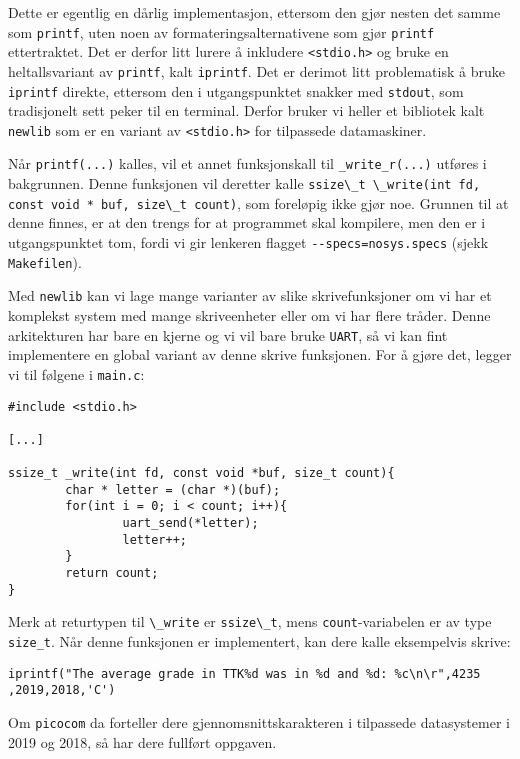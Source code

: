 Dette er egentlig en dårlig implementasjon, ettersom den gjør nesten det samme som \verb|printf|, uten noen av formateringsalternativene som gjør \verb|printf| ettertraktet. Det er derfor litt lurere å inkludere \verb|<stdio.h>| og bruke en heltallsvariant av \verb|printf|, kalt \verb|iprintf|. Det er derimot litt problematisk å bruke \verb|iprintf| direkte, ettersom den i utgangspunktet snakker med \verb|stdout|, som tradisjonelt sett peker til en terminal. Derfor bruker vi heller et bibliotek kalt \verb|newlib| som er en variant av \verb|<stdio.h>| for tilpassede datamaskiner.

Når \verb|printf(...)| kalles, vil et annet funksjonskall til \verb|_write_r(...)| utføres i bakgrunnen. Denne funksjonen vil deretter kalle \lstinline{ssize\_t \_write(int fd, const void * buf, size\_t count)}, som foreløpig ikke gjør noe. Grunnen til at denne finnes, er at den trengs for at programmet skal kompilere, men den er i utgangspunktet tom, fordi vi gir lenkeren flagget \verb|--specs=nosys.specs| (sjekk \verb|Makefilen|).

Med \verb|newlib| kan vi lage mange varianter av slike skrivefunksjoner om vi har et komplekst system med mange skriveenheter eller om vi har flere tråder. Denne arkitekturen har bare en kjerne og vi vil bare bruke \verb|UART|, så vi kan fint implementere en global variant av denne skrive funksjonen. For å gjøre det, legger vi til følgene i \verb|main.c|:


\begin{lstlisting}
#include <stdio.h>

[...]

ssize_t _write(int fd, const void *buf, size_t count){
        char * letter = (char *)(buf);
        for(int i = 0; i < count; i++){
                uart_send(*letter);
                letter++;
        }
        return count;
}
\end{lstlisting}

Merk at returtypen til \lstinline{\_write} er \lstinline{ssize\_t}, mens \verb|count|-variabelen er av type \verb|size_t|. Når denne funksjonen er implementert, kan dere kalle eksempelvis skrive:




\verb|iprintf("The average grade in TTK%d was in %d and %d: %c\n\r",4235|\newline
\verb|,2019,2018,'C')|

Om \verb|picocom| da forteller dere gjennomsnittskarakteren i tilpassede datasystemer i 2019 og 2018, så har dere fullført oppgaven.




